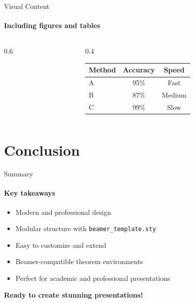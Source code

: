 \documentclass[aspectratio=169]{beamer}
\begin{document}
\begin{frame}{Visual Content}
    \framesubtitle{Including figures and tables}
    
    \begin{columns}[T]
        \begin{column}{0.6\textwidth}
            \begin{center}
            \end{center}
        \end{column}
        \begin{column}{0.4\textwidth}
            \small
            \begin{tabular}{@{}lcc@{}}
                \toprule
                Method & Accuracy & Speed \\
                \midrule
                A & 95\% & Fast \\
                B & 87\% & Medium \\
                C & 99\% & Slow \\
                \bottomrule
            \end{tabular}
        \end{column}
    \end{columns}
\end{frame}

\section{Conclusion}

\begin{frame}{Summary}
    \framesubtitle{Key takeaways}
    
    \begin{itemize}
        \item Modern and professional design
        \item Modular structure with \texttt{beamer\_template.sty}
        \item Easy to customize and extend
        \item Beamer-compatible theorem environments
        \item Perfect for academic and professional presentations
    \end{itemize}
    
    \vspace{2em}
    
    \begin{center}
        \Large \textbf{Ready to create stunning presentations!}
    \end{center}
\end{frame}
\end{document}
